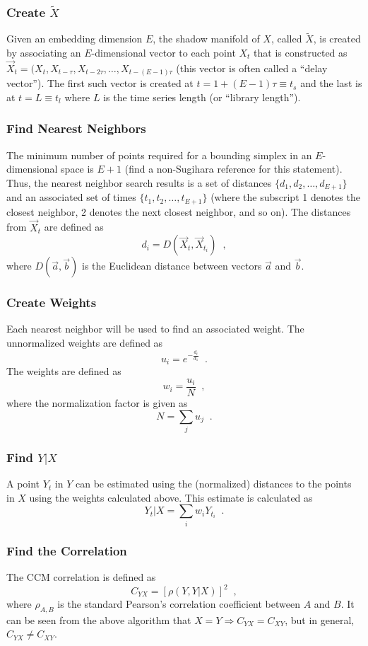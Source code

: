 \documentclass[a4paper,11pt,twocolumn]{article}
\begin{document}
\subsubsection{Create $\tilde{X}$}
Given an embedding dimension $E$, the shadow manifold of $X$, called $\tilde{X}$, is created by associating an $E$-dimensional vector to each point $X_t$ that is constructed as $\vec{X}_t=(X_t,X_{t-\tau},X_{t-2\tau},\ldots,X_{t-(E-1)\tau}$ (this vector is often called a ``delay vector'').  The first such vector is created at $t=1+(E-1)\tau\equiv t_s$ and the last is at $t=L\equiv t_l$ where $L$ is the time series length (or ``library length'').  

\subsubsection{Find Nearest Neighbors}
The minimum number of points required for a bounding simplex in an $E$-dimensional space is $E+1$ (find a non-Sugihara reference for this statement).  Thus, the nearest neighbor search results is a set of distances $\{d_1,d_2,\ldots,d_{E+1}\}$ and an associated set of times $\{t_1,t_2,\ldots,t_{E+1}\}$ (where the subscript 1 denotes the closest neighbor, 2 denotes the next closest neighbor, and so on).  The distances from $\vec{X}_t$ are defined as
$$
d_i = D\left(\vec{X}_t,\vec{X}_{t_i}\right)\;\;,
$$
where $D(\vec{a},\vec{b})$ is the Euclidean distance between vectors $\vec{a}$ and $\vec{b}$.

\subsubsection{Create Weights}
Each nearest neighbor will be used to find an associated weight.  The unnormalized weights are defined as
$$
u_i = e^{-\frac{d_i}{d_1}}\;\;.
$$
The weights are defined as
$$
w_i = \frac{u_i}{N}\;\;,
$$
where the normalization factor is given as
$$
N = \sum_j u_j\;\;.
$$

\subsubsection{Find $Y|X$}
A point $Y_t$ in $Y$ can be estimated using the (normalized) distances to the points in $X$ using the weights calculated above.  This estimate is calculated as
$$
Y_t|X = \sum_i w_i Y_{t_i}\;\;.
$$

\subsubsection{Find the Correlation}
The CCM correlation is defined as 
$$
C_{YX} = \left[\rho\left(Y,Y|X\right)\right]^2\;\;,
$$
where $\rho_{A,B}$ is the standard Pearson's correlation coefficient between $A$ and $B$.  It can be seen from the above algorithm that $X=Y \Rightarrow C_{YX}=C_{XY}$, but in general, $C_{YX}\neq C_{XY}$.  
\end{document}
